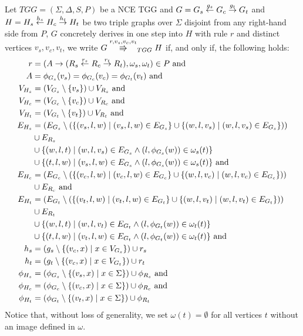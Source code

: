 \begin{definition}
	\label{def:tgg_dstep}
	Let $TGG = (\Sigma, \Delta, S, P)$ be a NCE TGG and $G = G_s \overset{g_s}{\leftarrow} G_c \overset{g_t}{\rightarrow} G_t$ and $H = H_s \overset{h_s}{\leftarrow} H_c \overset{h_t}{\rightarrow} H_t$ be two triple graphs over $\Sigma$ disjoint from any right-hand side from $P$, $G$ concretely derives in one step into $H$ with rule $r$ and distinct vertices $v_s, v_c, v_t$, we write $G \tcderiv{r}{v_s,v_c,v_t}{TGG} H$ if, and only if, the following holds:
	\begin{align*}
		r & = (A \to (R_s \overset{r_s}{\leftarrow} R_c \overset{r_t}{\rightarrow} R_t), \omega_s, \omega_t) \in P \text{ and } \\
		A & = \phi_{G_s}(v_s) = \phi_{G_c}(v_c) = \phi_{G_t}(v_t) \text{ and}\\
		V_{H_s}  & = (V_{G_s} \setminus \{v_s\}) \cup V_{R_s} \text{ and}\\
		V_{H_c}  & = (V_{G_c} \setminus \{v_c\}) \cup V_{R_c} \text{ and}\\
		V_{H_t}  & = (V_{G_t} \setminus \{v_t\}) \cup V_{R_t} \text{ and}\\
		E_{H_s} & = (E_{G_s} \setminus (\{(v_s,l,w) \; | \; (v_s,l,w) \in E_{G_s}\} \cup \{(w,l,v_s) \; | \; (w,l,v_s) \in E_{G_s}\})) \\
		& \cup E_{R_s} \\
		& \cup \{(w,l,t) \; | \; (w,l,v_s) \in E_{G_s} \land (l,\phi_{G_s}(w)) \in \omega_{s}(t)\} \\
		& \cup \{(t,l,w) \; | \; (v_s,l,w) \in E_{G_s} \land (l,\phi_{G_s}(w)) \in \omega_{s}(t)\} \text{ and} \\
		E_{H_c} & = (E_{G_c} \setminus (\{(v_c,l,w) \; | \; (v_c,l,w) \in E_{G_c}\} \cup \{(w,l,v_c) \; | \; (w,l,v_c) \in E_{G_c}\})) \\
		& \cup E_{R_c} \text{ and} \\
		E_{H_t} & = (E_{G_t} \setminus (\{(v_t,l,w) \; | \; (v_t,l,w) \in E_{G_t}\} \cup \{(w,l,v_t) \; | \; (w,l,v_t) \in E_{G_t}\})) \\
		& \cup E_{R_t} \\
		& \cup \{(w,l,t) \; | \; (w,l,v_t) \in E_{G_t} \land (l,\phi_{G_t}(w)) \in \omega_{t}(t)\} \\
		& \cup \{(t,l,w) \; | \; (v_t,l,w) \in E_{G_t} \land (l,\phi_{G_t}(w)) \in \omega_{t}(t)\} \text{ and} \\
		h_s		& = (g_s \setminus \{(v_c,x) \; | \; x \in V_{G_s}\}) \cup r_s  \\
		h_t		& = (g_t \setminus \{(v_c,x) \; | \; x \in V_{G_t}\}) \cup r_t  \\
		\phi_{H_s} & = (\phi_{G_s} \setminus \{(v_s,x) \; | \; x \in \Sigma\}) \cup \phi_{R_s} \text{ and}\\
		\phi_{H_c} & = (\phi_{G_c} \setminus \{(v_c,x) \; | \; x \in \Sigma\}) \cup \phi_{R_c} \text{ and}\\
		\phi_{H_t} & = (\phi_{G_t} \setminus \{(v_t,x) \; | \; x \in \Sigma\}) \cup \phi_{R_t}\\
	\end{align*}
	Notice that, without loss of generality, we set $\omega(t) = \emptyset$ for all vertices $t$ without an image defined in $\omega$.
	

\end{definition}
